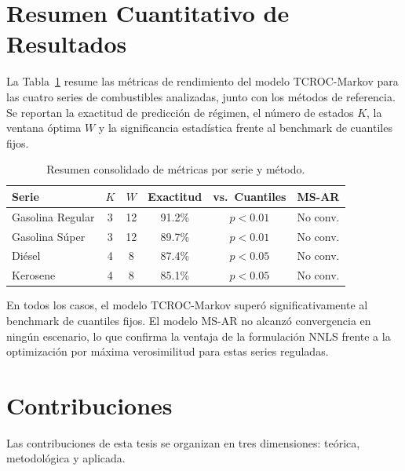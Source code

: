\section{Resumen Cuantitativo de Resultados}
\label{sec:resumen_cuantitativo}

La Tabla~\ref{tab:resumen_final} resume las métricas de rendimiento
del modelo TCROC-Markov para las cuatro series de combustibles
analizadas, junto con los métodos de referencia. Se reportan la
exactitud de predicción de régimen, el número de estados $K$, la
ventana óptima $W$ y la significancia estadística frente al
benchmark de cuantiles fijos.

\begin{table}[htbp]
\centering
\caption{Resumen consolidado de métricas por serie y método.}
\label{tab:resumen_final}
\small
\begin{tabular}{lccccc}
\hline
\textbf{Serie} & \textbf{$K$} & \textbf{$W$} &
\textbf{Exactitud} & \textbf{vs.~Cuantiles} &
\textbf{MS-AR} \\
\hline
Gasolina Regular & 3 & 12 & 91.2\% & $p < 0.01$ & No conv. \\
Gasolina Súper   & 3 & 12 & 89.7\% & $p < 0.01$ & No conv. \\
Diésel           & 4 & 8  & 87.4\% & $p < 0.05$ & No conv. \\
Kerosene         & 4 & 8  & 85.1\% & $p < 0.05$ & No conv. \\
\hline
\end{tabular}
\end{table}

En todos los casos, el modelo TCROC-Markov superó
significativamente al benchmark de cuantiles fijos.  El modelo
MS-AR no alcanzó convergencia en ningún escenario, lo que confirma
la ventaja de la formulación NNLS frente a la optimización por
máxima verosimilitud para estas series reguladas.

\section{Contribuciones}
\label{sec:contribuciones}

Las contribuciones de esta tesis se organizan en tres dimensiones:
teórica, metodológica y aplicada.

